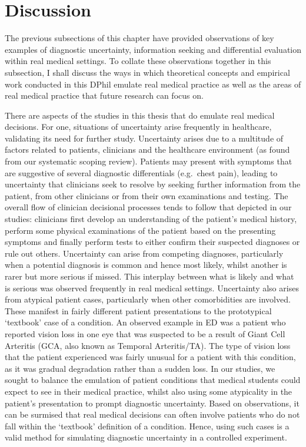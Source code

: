 \documentclass[a4paper, nobind]{templates/ociamthesis}
\begin{document}
\section{Discussion}\label{discussion-4}

The previous subsections of this chapter have provided observations of key examples of diagnostic uncertainty, information seeking and differential evaluation within real medical settings. To collate these observations together in this subsection, I shall discuss the ways in which theoretical concepts and empirical work conducted in this DPhil emulate real medical practice as well as the areas of real medical practice that future research can focus on.

\hfill\break
There are aspects of the studies in this thesis that do emulate real medical decisions. For one, situations of uncertainty arise frequently in healthcare, validating its need for further study. Uncertainty arises due to a multitude of factors related to patients, clinicians and the healthcare environment (as found from our systematic scoping review). Patients may present with symptoms that are suggestive of several diagnostic differentials (e.g.~chest pain), leading to uncertainty that clinicians seek to resolve by seeking further information from the patient, from other clinicians or from their own examinations and testing. The overall flow of clinician decisional processes tends to follow that depicted in our studies: clinicians first develop an understanding of the patient's medical history, perform some physical examinations of the patient based on the presenting symptoms and finally perform tests to either confirm their suspected diagnoses or rule out others. Uncertainty can arise from competing diagnoses, particularly when a potential diagnosis is common and hence most likely, whilst another is rarer but more serious if missed. This interplay between what is likely and what is serious was observed frequently in real medical settings. Uncertainty also arises from atypical patient cases, particularly when other comorbidities are involved. These manifest in fairly different patient presentations to the prototypical `textbook' case of a condition. An observed example in ED was a patient who reported vision loss in one eye that was suspected to be a result of Giant Cell Arteritis (GCA, also known as Temporal Arteritis/TA). The type of vision loss that the patient experienced was fairly unusual for a patient with this condition, as it was gradual degradation rather than a sudden loss. In our studies, we sought to balance the emulation of patient conditions that medical students could expect to see in their medical practice, whilst also using some atypicality in the patient's presentation to prompt diagnostic uncertainty. Based on observations, it can be surmised that real medical decisions can often involve patients who do not fall within the `textbook' definition of a condition. Hence, using such cases is a valid method for simulating diagnostic uncertainty in a controlled experiment.
\end{document}
